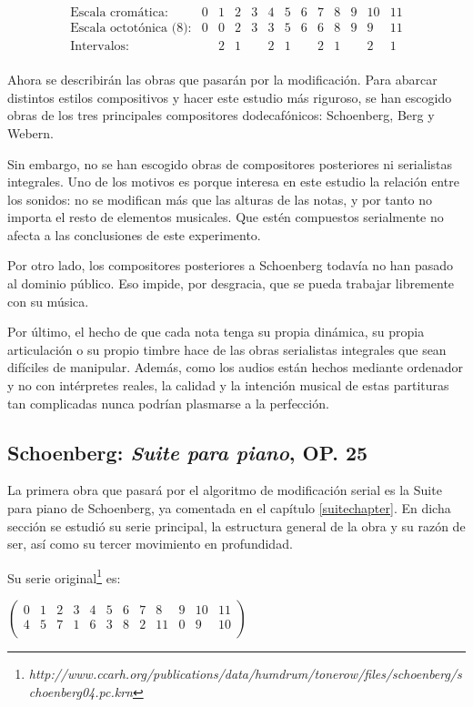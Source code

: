        $$\left.\begin{matrix}
        \text{Escala cromática:}&0&1&2&3&4&5&6&7&8&9&10&11\\
        \text{Escala octotónica (8):}&0&0&2&3&3&5&6&6&8&9&9&11\\
        \text{Intervalos:}&&2&1&&2&1&&2&1&&2&1\\
        \end{matrix}\right.$$
        
        Ahora se describirán las obras que pasarán por la modificación. Para abarcar distintos estilos compositivos y hacer este estudio más riguroso, se han escogido obras de los tres principales compositores dodecafónicos: Schoenberg, Berg y Webern.
        
        Sin embargo, no se han escogido obras de compositores posteriores ni serialistas integrales. Uno de los motivos es porque interesa en este estudio la relación entre los sonidos: no se modifican más que las alturas de las notas, y por tanto no importa el resto de elementos musicales. Que estén compuestos serialmente no afecta a las conclusiones de este experimento.
        
        Por otro lado, los compositores posteriores a Schoenberg todavía no han pasado al dominio público. Eso impide, por desgracia, que se pueda trabajar libremente con su música.
        
        Por último, el hecho de que cada nota tenga su propia dinámica, su propia articulación o su propio timbre hace de las obras serialistas integrales que sean difíciles de manipular. Además, como los audios están hechos mediante ordenador y no con intérpretes reales, la calidad y la intención musical de estas partituras tan complicadas nunca podrían plasmarse a la perfección.
        
        \subsection*{Schoenberg: \textit{Suite para piano}, OP. 25}
        La primera obra que pasará por el algoritmo de modificación serial es la Suite para piano de Schoenberg, ya comentada en el capítulo \ref{suitechapter}. En dicha sección se estudió su serie principal, la estructura general de la obra y su razón de ser, así como su tercer movimiento en profundidad.
        
        Su serie original\footnote{\textit{http://www.ccarh.org/publications/data/humdrum/tonerow/files/schoenberg/schoenberg04.pc.krn}} es: 
        \begin{footnotesize}
        	$\left(\begin{matrix}0&1&2&3&4&5&6&7&8&9&10&11\\4&5&7&1&6&3&8&2&11&0&9&10\\\end{matrix}\right)$	
        \end{footnotesize}
        

